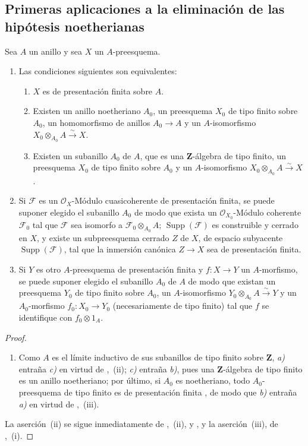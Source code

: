 \subsection{Primeras aplicaciones a la eliminación de las hipótesis noetherianas}
\label{subsection:IV.8.9-fr}

\begin{proposition}[8.9.1]
Sea $A$ un anillo y sea $X$ un $A$-preesquema.
\begin{enumerate}[label=\textup{(\roman*)}]
\item Las condiciones siguientes son equivalentes:
\begin{enumerate}[label=\emph{\alph*)}]
\item $X$ es de presentación finita sobre $A$.
\item Existen un anillo noetheriano $A_0$, un preesquema $X_0$ de tipo finito sobre $A_0$, un homomorfismo de anillos $A_0\to A$ y un $A$-isomorfismo $X_0\otimes_{A_0}A\xrightarrow{\sim}X$.
\item Existen un subanillo $A_0$ de $A$, que es una $\mathbf Z$-álgebra de tipo finito, un preesquema $X_0$ de tipo finito sobre $A_0$ y un $A$-isomorfismo $X_0\otimes_{A_0}A\xrightarrow{\sim}X$.
\end{enumerate}
\item Si $\mathcal F$ es un $\mathcal O_X$-Módulo cuasicoherente de presentación finita, se puede suponer elegido el subanillo $A_0$ de modo que exista un $\mathcal O_{X_0}$-Módulo coherente $\mathcal F_0$ tal que $\mathcal F$ sea isomorfo a $\mathcal F_0\otimes_{A_0}A$; $\operatorname{Supp}(\mathcal F)$ es construible y cerrado en $X$, y existe un subpreesquema cerrado $Z$ de $X$, de espacio subyacente $\operatorname{Supp}(\mathcal F)$, tal que la inmersión canónica $Z\to X$ sea de presentación finita.
\item Si $Y$ es otro $A$-preesquema de presentación finita y $f:X\to Y$ un $A$-morfismo, se puede suponer elegido el subanillo $A_0$ de $A$ de modo que existan un preesquema $Y_0$ de tipo finito sobre $A_0$, un $A$-isomorfismo $Y_0\otimes_{A_0}A\xrightarrow{\sim}Y$ y un $A_0$-morfismo $f_0:X_0\to Y_0$ (necesariamente de tipo finito) tal que $f$ se identifique con $f_0\otimes1_A$.
\end{enumerate}
\end{proposition}

\begin{proof}
\begin{enumerate}[label=(\roman*)]
\item Como $A$ es el límite inductivo de sus subanillos de tipo finito sobre $\mathbf Z$, \emph{a)} entraña \emph{c)} en virtud de ,~(ii); \emph{c)} entraña \emph{b)}, pues una $\mathbf Z$-álgebra de tipo finito es un anillo noetheriano; por último, si $A_0$ es noetheriano, todo $A_0$-preesquema de tipo finito es de presentación finita , de modo que \emph{b)} entraña \emph{a)} en virtud de ,~(iii).
\end{enumerate}
La aserción~(ii) se sigue inmediatamente de ,~(ii),  y , y la aserción~(iii), de ,~(i).
\end{proof}

